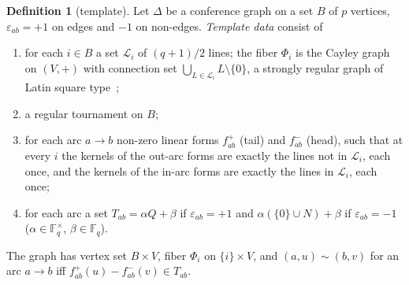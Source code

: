 \documentclass[11pt]{amsart}
\theoremstyle{definition}
\newtheorem{definition}[theorem]{Definition}
\theoremstyle{remark}
\newcommand{\F}{\mathbb{F}}
\begin{document}
\begin{definition}[template]\label{def:template}
Let $\Delta$ be a conference graph on a set $B$ of $p$ vertices, $\varepsilon_{ab}=+1$ on edges and $-1$ on non-edges.
\emph{Template data} consist of
\begin{enumerate}
\item[(T1)] for each $i\in B$ a set $\mathcal L_i$ of $(q+1)/2$ lines; the fiber $\Phi_i$ is the Cayley graph on
$(V,+)$ with connection set $\bigcup_{L\in\mathcal L_i}L\setminus\{0\}$, a strongly regular graph of Latin square
type~\cite{CalderbankKantor1986};
\item[(T2)] a regular tournament on $B$;
\item[(T3)] for each arc $a\to b$ non-zero linear forms $f^+_{ab}$ (tail) and $f^-_{ab}$ (head), such that at every $i$
the kernels of the out-arc forms are exactly the lines not in $\mathcal L_i$, each once, and the kernels of the in-arc
forms are exactly the lines in $\mathcal L_i$, each once;
\item[(T4)] for each arc a set $T_{ab}=\alpha Q+\beta$ if $\varepsilon_{ab}=+1$ and $\alpha(\{0\}\cup N)+\beta$ if
$\varepsilon_{ab}=-1$ ($\alpha\in\F_q^\times$, $\beta\in\F_q$).
\end{enumerate}
The graph has vertex set $B\times V$, fiber $\Phi_i$ on $\{i\}\times V$, and $(a,u)\sim(b,v)$ for an arc $a\to b$ iff
$f^+_{ab}(u)-f^-_{ab}(v)\in T_{ab}$.
\end{definition}
\end{document}
